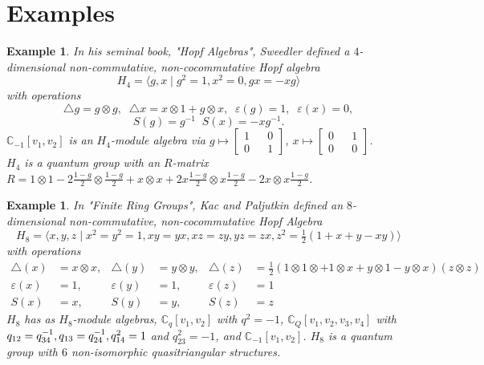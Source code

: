 \documentclass[12pt,a4paper]{article}
\newtheorem{example}[theorem]{Example}
\newcommand\1{_{(1)}}
\newcommand\2{_{(2)}}
\begin{document}
\section{Examples}

\begin{example}
    In his seminal book, "Hopf Algebras", Sweedler defined a $4$-dimensional non-commutative, non-cocommutative Hopf algebra
    \[
    H_4=\langle g,x\;\vert\; g^2=1, x^2=0,gx=-xg\rangle
    \]
    with operations
    \[
    \triangle{g}=g\otimes g,\;\; \triangle{x}=x\otimes 1+g\otimes x,\;\;\varepsilon(g)=1,\;\;\varepsilon(x)=0,
    \]
    \[
    S(g)=g^{-1}\;\;S(x)=-xg^{-1}.
    \]
   $\mathbb{C}_{-1}[v_1,v_2]$ is an $H_4$-module algebra via $g\mapsto \begin{bmatrix} 1&&0\\0&&1\end{bmatrix}$, $x\mapsto\begin{bmatrix} 0&&1\\0&&0\end{bmatrix}$.
   \\$H_4$ is a quantum group with an $R$-matrix $R=1\otimes 1-2\tfrac{1-g}{2}\otimes\tfrac{1-g}{2}+x\otimes x+2x\tfrac{1-g}{2}\otimes x\tfrac{1-g}{2}-2x\otimes x\tfrac{1-g}{2}$.
\end{example}

\begin{example}
 In "Finite Ring Groups", Kac and Paljutkin defined an $8$-dimensional non-commutative, non-cocommutative Hopf Algebra
 \[
   H_8=\langle x,y,z\;\vert\; x^2=y^2=1,xy=yx,xz=zy,yz=zx,z^2=\tfrac{1}{2}(1+x+y-xy)\rangle 
 \]
 with operations
 \begin{align*}
   \triangle(x)&=x\otimes x, & \triangle(y)&=y\otimes y, & \triangle(z)&=\tfrac{1}{2}(1\otimes 1\otimes +1\otimes x+y\otimes 1-y\otimes x)(z\otimes z)\\
   \varepsilon(x)&=1, & \varepsilon(y)&=1, & \varepsilon(z)&=1\\
   S(x)&=x, & S(y)&=y, & S(z)&=z
 \end{align*}
$H_8$ has as $H_8$-module algebras, $\mathbb{C}_q[v_1,v_2]$ with $q^2=-1$, $\mathbb{C}_Q[v_1,v_2,v_3,v_4]$ with $q_{12}=q_{34}^{-1}, \\q_{13}=q_{24}^{-1}, q_{14}^2=1$ and $q_{23}^2=-1$, and $\mathbb{C}_{-1}[v_1,v_2]$.
$H_8$ is a quantum group with $6$ non-isomorphic quasitriangular structures.
\end{example}
\end{document}
